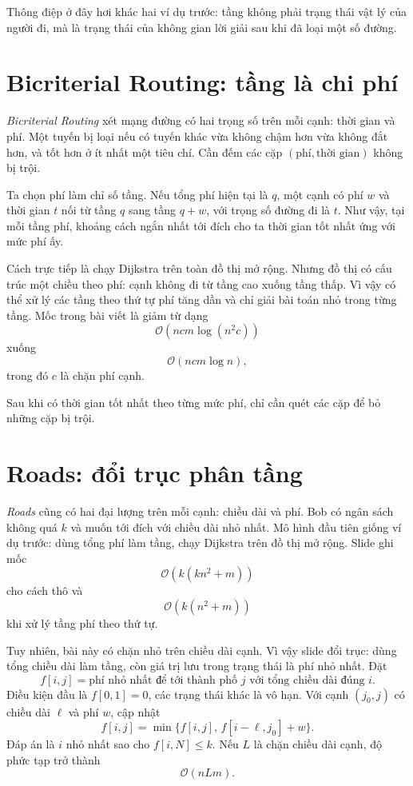 \documentclass[11pt]{article}
\newcommand{\Oh}{\mathcal{O}}
\begin{document}
Thông điệp ở đây hơi khác hai ví dụ trước: tầng không phải trạng thái vật lý
của người đi, mà là trạng thái của không gian lời giải sau khi đã loại một số
đường.

\section{Bicriterial Routing: tầng là chi phí}

\textit{Bicriterial Routing} xét mạng đường có hai trọng số trên mỗi cạnh:
thời gian và phí. Một tuyến bị loại nếu có tuyến khác vừa không chậm hơn vừa
không đắt hơn, và tốt hơn ở ít nhất một tiêu chí. Cần đếm các cặp
\((\text{phí},\text{thời gian})\) không bị trội.

Ta chọn phí làm chỉ số tầng. Nếu tổng phí hiện tại là \(q\), một cạnh có phí
\(w\) và thời gian \(t\) nối từ tầng \(q\) sang tầng \(q+w\), với trọng số
đường đi là \(t\). Như vậy, tại mỗi tầng phí, khoảng cách ngắn nhất tới đích
cho ta thời gian tốt nhất ứng với mức phí ấy.

Cách trực tiếp là chạy Dijkstra trên toàn đồ thị mở rộng. Nhưng đồ thị có
cấu trúc một chiều theo phí: cạnh không đi từ tầng cao xuống tầng thấp. Vì
vậy có thể xử lý các tầng theo thứ tự phí tăng dần và chỉ giải bài toán nhỏ
trong từng tầng. Mốc trong bài viết là giảm từ dạng
\[
  \Oh(ncm\log(n^2c))
\]
xuống
\[
  \Oh(ncm\log n),
\]
trong đó \(c\) là chặn phí cạnh.

Sau khi có thời gian tốt nhất theo từng mức phí, chỉ cần quét các cặp để bỏ
những cặp bị trội.

\section{Roads: đổi trục phân tầng}

\textit{Roads} cũng có hai đại lượng trên mỗi cạnh: chiều dài và phí. Bob có
ngân sách không quá \(k\) và muốn tới đích với chiều dài nhỏ nhất. Mô hình
đầu tiên giống ví dụ trước: dùng tổng phí làm tầng, chạy Dijkstra trên đồ thị
mở rộng. Slide ghi mốc
\[
  \Oh(k(kn^2+m))
\]
cho cách thô và
\[
  \Oh(k(n^2+m))
\]
khi xử lý tầng phí theo thứ tự.

Tuy nhiên, bài này có chặn nhỏ trên chiều dài cạnh. Vì vậy slide đổi trục:
dùng tổng chiều dài làm tầng, còn giá trị lưu trong trạng thái là phí nhỏ
nhất. Đặt
\[
  f[i,j]=\text{phí nhỏ nhất để tới thành phố }j
  \text{ với tổng chiều dài đúng }i.
\]
Điều kiện đầu là \(f[0,1]=0\), các trạng thái khác là vô hạn. Với cạnh
\((j_0,j)\) có chiều dài \(\ell\) và phí \(w\), cập nhật
\[
  f[i,j]=\min\{f[i,j],\,f[i-\ell,j_0]+w\}.
\]
Đáp án là \(i\) nhỏ nhất sao cho \(f[i,N]\le k\). Nếu \(L\) là chặn chiều dài
cạnh, độ phức tạp trở thành
\[
  \Oh(nLm).
\]
\end{document}
